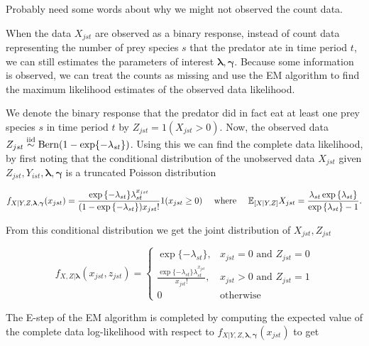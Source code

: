Probably need some words about why we might not observed the count data.  

When the data $X_{jst}$ are observed as a binary response, instead of count data representing the number of prey species $s$ that the predator ate in time period $t$, we can still estimates the parameters of interest $\boldsymbol{\lambda}, \boldsymbol{\gamma}$.  Because some information is observed, we can treat the counts as missing and use the EM algorithm to find the maximum likelihood estimates of the observed data likelihood.  

We denote the binary response that the predator did in fact eat at least one prey species $s$ in time period $t$ by $Z_{jst} = 1(X_{jst} > 0)$.  Now, the observed data $Z_{jst} \stackrel{\mathrm{iid}}{\sim} \text{Bern}(1-\exp\{-\lambda_{st}\})$.  Using this we can find the complete data likelihood, by first noting that the conditional distribution of the unobserved data $X_{jst}$ given $Z_{jst}, Y_{ist}, \boldsymbol{\lambda}, \boldsymbol{\gamma}$ is a truncated Poisson distribution

\begin{equation*}
  f_{X|Y,Z,\boldsymbol{\lambda},\boldsymbol{\gamma}}(x_{jst}) =
  \frac{\exp{\{-\lambda_{st}\}} \lambda_{st}^{x_{jst}}}{(1 - \exp{\{-\lambda_{st}\}}) x_{jst}!}1(x_{jst} \geq 0) \quad \text{ where } \quad \mathbb{E}_{[X|Y,Z]}X_{jst} = \frac{\lambda_{st} \exp{\{\lambda_{st} \}}}{\exp{\{ \lambda_{st} \}} - 1}.
\end{equation*}

\noindent From this conditional distribution we get the joint distribution of $X_{jst}, Z_{jst}$

\begin{equation*}
    f_{X,Z|\boldsymbol{\lambda}}(x_{jst},z_{jst}) = \left\{
    \begin{array}{lr}
      \exp{\{ -\lambda_{st} \}}, & x_{jst}=0 \mbox{ and } Z_{jst} = 0 \\
      \frac{\exp{\{-\lambda_{st} \}} \lambda_{st}^{x_{jst}}}{x_{jst}!}, & x_{jst} > 0 \mbox{ and } Z_{jst} = 1\\
      0 & \mbox{otherwise}
    \end{array}
  \right.
\end{equation*}

\noindent The E-step of the EM algorithm is completed by computing the expected value of the complete data log-likelihood with respect to $f_{X|Y,Z,\boldsymbol{\lambda},\boldsymbol{\gamma}}(x_{jst})$ to get


